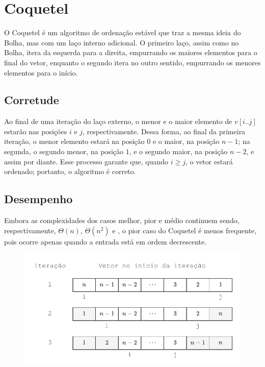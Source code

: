 \section{Coquetel}
O Coquetel é um algoritmo de ordenação estável que traz a mesma ideia do Bolha, mas com um laço interno adicional. O primeiro laço, assim como no Bolha, itera da esquerda para a direita, empurrando os maiores elementos para o final do vetor, enquanto o segundo itera no outro sentido, empurrando os menores elementos para o início.



\subsection*{Corretude}
Ao final de uma iteração do laço externo, o menor e o maior elemento de $v[i..j]$ estarão nas posições $i$ e $j$, respectivamente. Dessa forma, ao final da primeira iteração, o menor elemento estará na posição $0$ e o maior, na posição $n - 1$; na segunda, o segundo menor, na posição $1$, e o segundo maior, na posição $n - 2$, e assim por diante. Esse processo garante que, quando $i \geq j$, o vetor estará ordenado; portanto, o algoritmo é correto.

\subsection*{Desempenho}
Embora as complexidades dos casos melhor, pior e médio continuem sendo, respectivamente, $\Theta(n)$, $\Theta(n^2)$ e , o pior caso do Coquetel é menos frequente, pois ocorre apenas quando a entrada está em ordem decrescente.

\begin{figure}[H]
\centering
\includegraphics[scale=1.0]{figuras/pdf/coquetel.pdf}
\end{figure}

